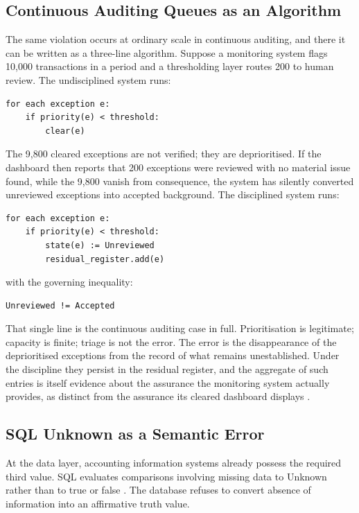 \documentclass[smallcondensed,envcountsect,natbib]{svjour3}
\newcommand{\state}[1]{\textsf{#1}}
\begin{document}
\subsection{Continuous Auditing Queues as an Algorithm}
\label{sec:ca}

The same violation occurs at ordinary scale in continuous auditing, and there it can be written as a three-line algorithm. Suppose a monitoring system flags 10{,}000 transactions in a period and a thresholding layer routes 200 to human review. The undisciplined system runs:

\begin{lstlisting}
for each exception e:
    if priority(e) < threshold:
        clear(e)
\end{lstlisting}

The 9{,}800 cleared exceptions are not verified; they are deprioritised. If the dashboard then reports that 200 exceptions were reviewed with no material issue found, while the 9{,}800 vanish from consequence, the system has silently converted unreviewed exceptions into accepted background. The disciplined system runs:

\begin{lstlisting}
for each exception e:
    if priority(e) < threshold:
        state(e) := Unreviewed
        residual_register.add(e)
\end{lstlisting}

with the governing inequality:

\begin{lstlisting}
Unreviewed != Accepted
\end{lstlisting}

That single line is the continuous auditing case in full. Prioritisation is legitimate; capacity is finite; triage is not the error. The error is the disappearance of the deprioritised exceptions from the record of what remains unestablished. Under the discipline they persist in the residual register, and the aggregate of such entries is itself evidence about the assurance the monitoring system actually provides, as distinct from the assurance its cleared dashboard displays \citep{alles2006, issa2016, austin2021}.

\subsection{SQL Unknown as a Semantic Error}
\label{sec:sql}

At the data layer, accounting information systems already possess the required third value. SQL evaluates comparisons involving missing data to \state{Unknown} rather than to true or false \citep{codd1979}. The database refuses to convert absence of information into an affirmative truth value.
\end{document}
